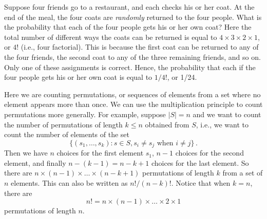 \begin{example}
    Suppose four friends go to a restaurant, and each checks his or her coat. At the end of the meal, the four coats are \emph{randomly} returned to the four people. What is the probability that each of the four people gets his or her own coat? Here the total number of different ways the coats can be returned  is equal to $4\times3\times2\times1$, or $4!$ (i.e., four factorial). This is because the first coat can be returned to any of the four friends, the second coat to any of the three remaining friends, and so on. Only one of these assignments is correct. Hence, the probability that each if the four people gets his or her own coat is equal to $1/4!$, or 1/24.

    Here we are counting permutations, or sequences of elements from a set where no element appears more than once. We can use the multiplication principle to count permutations more generally. For example, suppose $|S|=n$ and we want to count the number of permutations of length $k \leqslant n$ obtained from $S$, i.e., we want to count the number of elements of the set
    $$
    \{(s_1,\dots,s_k):s\in S, s_i \neq s_j \text{ when } i \neq j\}\,.
    $$
    Then we have $n$ choices for the first element $s_1$, $n-1$ choices for the second element, and finally $n-(k-1)=n-k+1$ choices for the last element. So there are $n\times(n-1)\times\dots\times(n-k+1)$ permutations of length $k$ from a set of $n$ elements. This can also be written as $n! / (n-k)!$. Notice that when $k=n$, there are
    $$
    n!=n\times(n-1)\times\dots\times2\times1
    $$
    permutations of length $n$.
\end{example}

